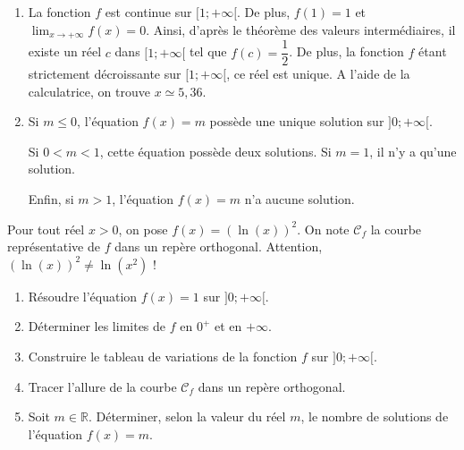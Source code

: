 \documentclass[11pt,fleqn, openany]{book} %
\begin{document}
\begin{solution}
\begin{enumerate}
\item  La fonction $f$ est continue sur $[1;+\infty[$. De plus, $f(1)=1$ et $\displaystyle \lim_{x\to+\infty}f(x)=0$. Ainsi, d'après le théorème des valeurs intermédiaires, il existe un réel $c$ dans $[1;+\infty[$ tel que $f(c)=\dfrac{1}{2}$. De plus, la fonction $f$ étant strictement décroissante sur $[1;+\infty[$, ce réel est unique. A l'aide de la calculatrice, on trouve $x \simeq 5,36$.

\item  Si $m \leqslant 0$, l'équation $f(x)=m$ possède une unique solution sur $]0;+\infty[$.

Si $0 < m < 1$, cette équation possède deux solutions. Si $m=1$, il n'y a qu'une solution. 

Enfin, si $m>1$, l'équation $f(x)=m$ n'a aucune solution.

\end{enumerate}
\end{solution}




\begin{exercise}[topic=log03] Pour tout réel $x>0$, on pose $f(x)=(\ln(x))^2$.
On note $\mathcal{C}_f$ la courbe représentative de $f$ dans un repère orthogonal. Attention, $(\ln(x))^2 \neq \ln(x^2)$ !
\begin{enumerate}
\item Résoudre l'équation $f(x)=1$ sur $]0;+\infty[$.
\item Déterminer les limites de $f$ en $0^+$ et en $+\infty$.
\item Construire le tableau de variations de la fonction $f$ sur $]0;+\infty[$. 
\item Tracer l'allure de la courbe $\mathcal{C}_f$ dans un repère orthogonal.
\item Soit $m \in \mathbb{R}$. Déterminer, selon la valeur du réel $m$, le nombre de solutions de l'équation $f(x)=m$.
\end{enumerate}
\end{exercise}
\end{document}
